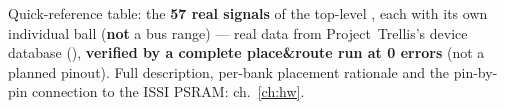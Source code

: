 \thispagestyle{plain}
\noindent
{}

\vspace{6pt}
\noindent
{\footnotesize
Quick-reference table: the \textbf{57 real signals} of the top-level
, each with its own individual  ball
(\textbf{not} a bus range) --- real data from Project~Trellis's device
database (), \textbf{verified by a complete
 place\&route run at 0 errors} (not a planned pinout).
Full description, per-bank placement rationale and the pin-by-pin
connection to the ISSI PSRAM: ch.~\ref{ch:hw}.
}


